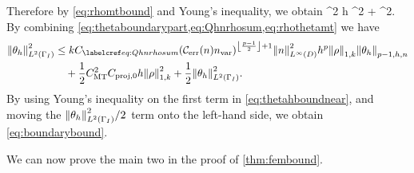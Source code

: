 \eeq
Therefore by \cref{eq:rhomtbound} and Young's inequality, we obtain
\beq\label{eq:rhothetamt}
\NLtGI{\rho}\NLtGI{\thetah} \leq \half \CMT^2  h \NW{\rho}^2 + \half \NLtGI{\thetah}^2.
\eeq
By combining \cref{eq:thetaboundarypart,eq:Qhnrhosum,eq:rhothetamt} we have
\begin{align}
\NLtGI{\thetah}^2 &\leq k \Cmess \mleft(\En\nvar\mright)^{\floor{\frac{p-1}2}+1}\NLiD{n}^2 h^p \NW{\rho}\Nfn{p-1,h,n}{\thetah}\nonumber\\
&\quad+ \half \CMT^2 \Cprojfn{0} h\NW{\rho}^2 + \half \NLtGI{\thetah}^2.\label{eq:thetahboundnear}
\end{align}
By using Young's inequality on the first term in \cref{eq:thetahboundnear}, and moving the $\NLtGI{\thetah}^2/2$ term onto the left-hand side, we obtain \cref{eq:boundarybound}.
\epf

We can now prove the main two  in the proof of \cref{thm:fembound}.

